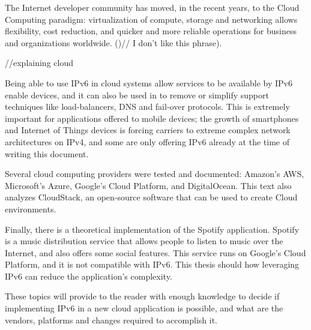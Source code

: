 The Internet developer community has moved, in the recent years, to the Cloud Computing paradigm: virtualization of compute, storage and networking allows flexibility, cost reduction, and quicker and more reliable operations for business and organizations worldwide. ()// I don't like this phrase). 

//explaining cloud 

Being able to use IPv6 in cloud systems allow services to be available by IPv6 enable devices, and it can also be used in to remove or simplify support techniques like load-balancers, DNS and fail-over protocols. This is extremely important for applications offered to mobile devices; the growth of smartphones and Internet of Things devices is forcing carriers to extreme complex network architectures on IPv4, and some are only offering IPv6 already at the time of writing this document.

Several cloud computing providers were tested and documented: Amazon's AWS, Microsoft's Azure, Google's Cloud Platform, and DigitalOcean. This text also analyzes CloudStack, an open-source software that can be used to create Cloud environments. 

Finally, there is a theoretical implementation of the Spotify application. Spotify is a music distribution service that allows people to listen to music over the Internet, and also offers some social features. This service runs on Google's Cloud Platform, and it is not compatible with IPv6. This thesis should how leveraging IPv6 can reduce the application's complexity.

These topics will provide to the reader with enough knowledge to decide if implementing IPv6 in a new cloud application is possible, and what are the vendors, platforms and changes required to accomplish it.